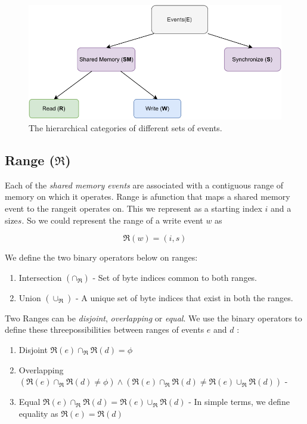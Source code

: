         \begin{figure}[H]
            \centering 
            \includegraphics[scale=0.7]{ECMAScriptMemoryModel/EventTypes.pdf}
            \caption{The hierarchical categories of different sets of events.}
        \end{figure}

    \subsection{Range ($\Re$)}
        Each of the \textit{shared memory events} are associated with a contiguous range of memory on which it operates. Range is afunction that maps a shared memory event to the range\footnotemark it operates on. This we represent as a starting index $i$ and a size$s$. So we could represent the range of a write event $w$ as 
                
                \[\Re(w) = (i, s) \]
    
        
        We define the two binary operators below on ranges: 
        \begin{enumerate}
            \item Intersection $(\cap{_\Re})$ - Set of byte indices common to both ranges.
            \item Union $(\cup_\Re)$ - A unique set of byte indices that exist in both the ranges.  
        \end{enumerate}
        
        Two Ranges can be \textit{disjoint}, \textit{overlapping} or \textit{equal}. We use the binary operators to define these threepossibilities between ranges of events $e$ and $d$ :
        \begin{enumerate}
            \item Disjoint $\Re(e) \cap_\Re \Re(d) = \phi$ 
            \item Overlapping $(\Re(e)\cap_\Re \Re(d) \neq \phi) \wedge (\Re(e) \cap_\Re  \Re(d) \neq \Re(e) \cup_\Re \Re(d))$ - 
            \item Equal $\Re(e) \cap_\Re  \Re(d) = \Re(e) \cup_\Re \Re(d)$ - In simple terms, we define equality as $\Re(e) = \Re(d)$
        \end{enumerate}
            
